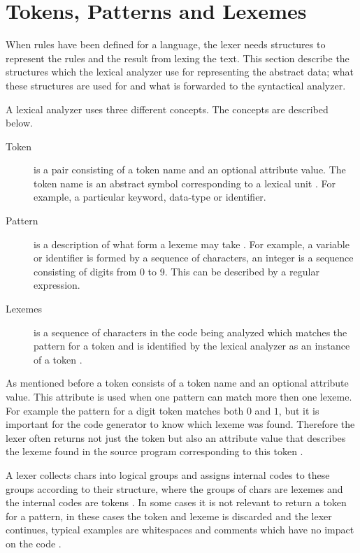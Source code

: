 \section{Tokens, Patterns and Lexemes}
When rules have been defined for a language, the lexer needs structures to
represent the rules and the result from lexing the text. 
This section describe the structures which the lexical analyzer use
for representing the abstract data; what these structures are used for and what is 
forwarded to the syntactical analyzer. 

A lexical analyzer uses three different concepts. The concepts are described 
below. 
\begin{description}
  \item[Token]
    is a pair consisting of a token name and an optional attribute value. The 
token name is an abstract symbol corresponding to a lexical unit \cite{Aho2006}. 
For example, a particular keyword, data-type or identifier.
  \item[Pattern]
    is a description of what form a lexeme may take \cite{Aho2006}. 
For example, a variable or identifier is formed by a sequence of characters, an
integer is a sequence consisting of digits from 0 to 9. This can
be described by a regular expression.
  \item[Lexemes]
    is a sequence of characters in the code being analyzed which 
matches the pattern for a token and is identified by the lexical analyzer as an 
instance of a token \cite{Aho2006}.
\end{description}
As mentioned before a token consists of a token name and an optional attribute value. 
This attribute is used when one pattern can match more then one lexeme.
For example the pattern for a digit token matches both $0$ and $1$, 
but it is important for the code generator to know which lexeme was found. 
Therefore the lexer often returns not just the token but also an attribute value 
that describes the lexeme found in the source program corresponding to this 
token \cite{Aho2006}.

A lexer collects chars into logical groups and assigns 
internal codes to these groups according to their structure, 
where the groups of chars are lexemes and the internal codes are tokens \cite{sebesta2012}.
In some cases it is not relevant to return a token for a pattern, in these
cases the token and lexeme is discarded and the lexer continues,
typical examples are whitespaces and comments which have no impact on
the code \cite{Aho2006}.

